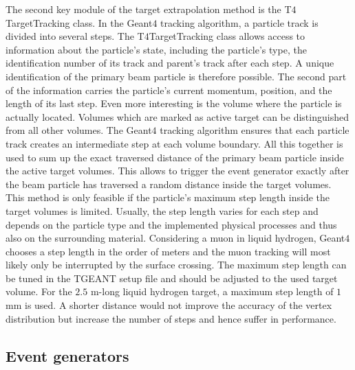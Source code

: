 The second key module of the target extrapolation method is the T$4$TargetTracking class. In the Geant$4$ tracking algorithm, a particle track is divided into several steps. The T$4$TargetTracking class allows access to information about the particle’s state, including the particle’s type, the identification number of its track and parent’s track after each step. A unique identification of the primary beam particle is therefore possible. The second part of the information carries the particle’s current momentum, position, and the length of its last step. Even more interesting is the volume where the particle is actually located. Volumes which are marked as active target can be distinguished from all other volumes. The Geant$4$ tracking algorithm ensures that each particle track creates an intermediate step at each volume boundary. All this together is used to sum up the exact traversed distance of the primary beam particle inside the active target volumes. This allows to trigger the event generator exactly after the beam particle has traversed a random distance inside the target volumes. This method is only feasible if the particle’s maximum step length inside the target volumes is limited. Usually, the step length varies for each step and depends on the particle type and the implemented physical processes and thus also on the surrounding material. Considering a muon in liquid hydrogen, Geant$4$ chooses a step length in the order of meters and the muon tracking will most likely only be interrupted by the surface crossing. The maximum step length can be tuned in the TGEANT setup file and should be adjusted to the used target volume. For the $2.5$ m-long liquid hydrogen target, a maximum step length of $1$ mm is used. A shorter distance would not improve the accuracy of the vertex distribution but increase the number of steps and hence suffer in performance.

\subsection{Event generators}

